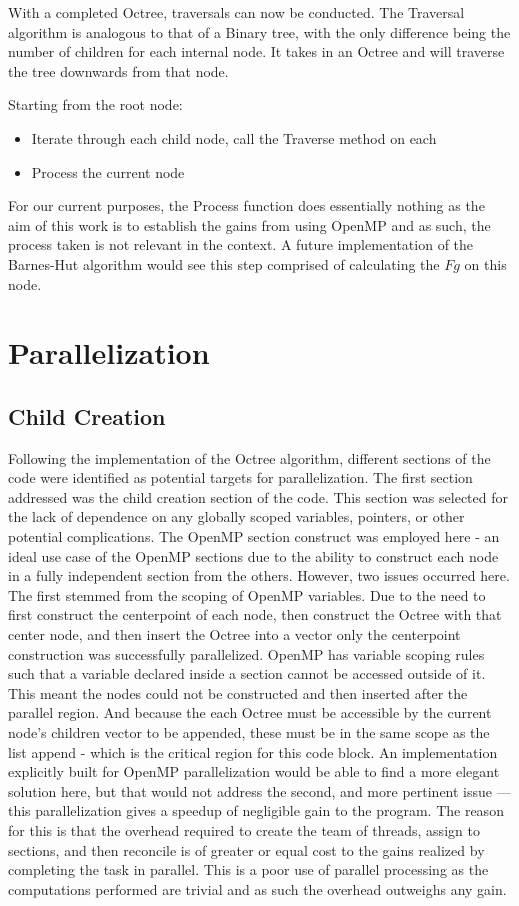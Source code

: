 \documentclass[11pt]{article}
\begin{document}
With a completed Octree, traversals can now be conducted. The Traversal algorithm is analogous to that of a Binary tree, with the only difference being the number of children for each internal node. It takes in an Octree and will traverse the tree downwards from that node.

Starting from the root node:
\begin{itemize}
\item{Iterate through each child node, call the Traverse method on each}
\item{Process the current node}
\end{itemize}
For our current purposes, the Process function does essentially nothing as the aim of this work is to establish the gains from using OpenMP and as such, the process taken is not relevant in the context. A future implementation of the Barnes-Hut algorithm would see this step comprised of calculating the \(Fg\) on this node. 



\section{Parallelization}
\subsection{Child Creation}
Following the implementation of the Octree algorithm, different sections of the code were identified as potential targets for parallelization. The first section addressed was the child creation section of the code. This section was selected for the lack of dependence on any globally scoped variables, pointers, or other potential complications. The OpenMP section construct was employed here - an ideal use case of the OpenMP sections due to the ability to construct each node in a fully independent section from the others. However, two issues occurred here. The first stemmed from the scoping of OpenMP variables. Due to the need to first construct the centerpoint of each node, then construct the Octree with that center node, and then insert the Octree into a vector only the centerpoint construction was successfully parallelized. OpenMP has variable scoping rules such that a variable declared inside a section cannot be accessed outside of it. This meant the nodes could not be constructed and then inserted after the parallel region. And because the each Octree must be accessible by the current node's children vector to be appended, these must be in the same scope as the list append - which is the critical region for this code block. An implementation explicitly built for OpenMP parallelization would be able to find a more elegant solution here, but that would not address the second, and more pertinent issue --- this parallelization gives a speedup of negligible gain to the program. The reason for this is that the overhead required to create the team of threads, assign to sections, and then reconcile is of greater or equal cost to the gains realized by completing the task in parallel. This is a poor use of parallel processing as the computations performed are trivial and as such the overhead outweighs any gain.
\end{document}

